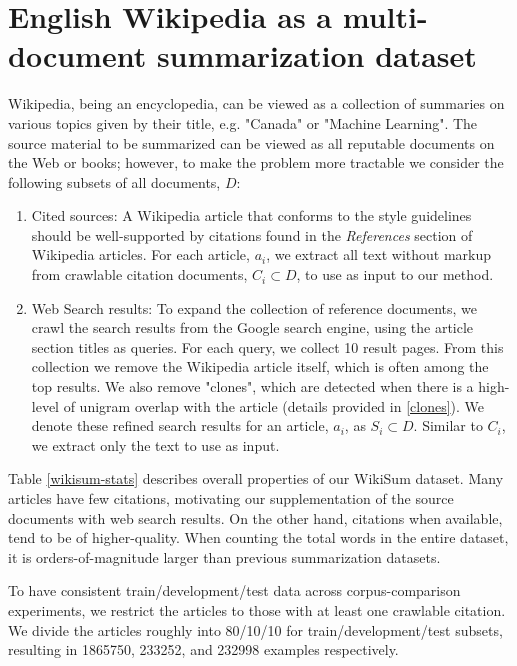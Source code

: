 \section{English Wikipedia as a multi-document summarization dataset}
Wikipedia, being an encyclopedia, can be viewed as a collection of
summaries on various topics given by their title,
e.g. "Canada" or "Machine Learning". The source material to be 
summarized can be viewed as all reputable documents on the Web or
books; however, to make the problem more tractable we consider the following
subsets of all documents, $D$: 

\begin{enumerate}
    \item Cited sources:
A Wikipedia article that conforms to the style
guidelines should be well-supported by citations found in the
\textit{References} section of Wikipedia articles.
For each article, $a_i$, we extract all text without
markup from crawlable citation documents, $C_i \subset D$, to use as input
to our method.
\item Web Search results:
To expand the collection of reference documents, we crawl the search results
from the Google search engine, using the article section titles as queries.
For each query, we collect 10 result pages. From this collection we remove
the Wikipedia article itself, which is often among the top results.
We also remove "clones", which are detected
when there is a high-level of unigram overlap with the article (details provided in \ref{clones}).
We denote these refined search results for an article, $a_i$, as $S_i \subset D$.
Similar to $C_i$, we extract only the text to use as input.
\end{enumerate}


Table \ref{wikisum-stats} describes overall properties of our WikiSum dataset.
Many articles have few citations, motivating our supplementation of the source
documents with web search results. On the other hand, citations when
available, tend to be of higher-quality.  When counting the total words
in the entire dataset, it is orders-of-magnitude larger than previous summarization
datasets.

To have consistent train/development/test data across corpus-comparison experiments,
 we restrict the articles to those with at least one crawlable citation.
We divide the articles roughly into 80/10/10 for train/development/test subsets,
resulting in 1865750, 233252, and 232998 examples respectively.
